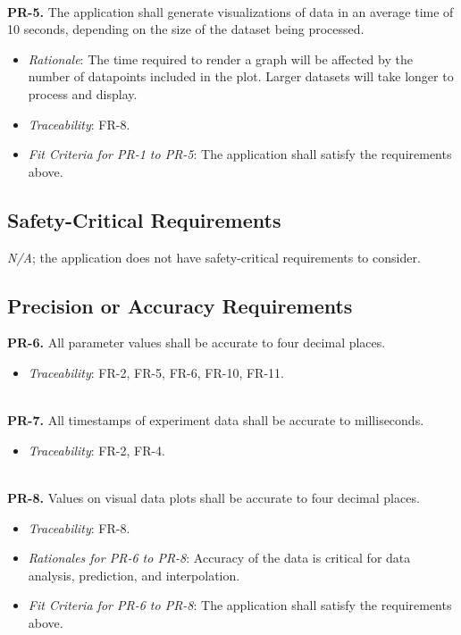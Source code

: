 \documentclass[12pt]{article}
\begin{document}
\ \\
\textbf{PR-5.} The application shall generate visualizations of data in an average time of 10 seconds, depending on the size of the dataset being processed.
  \begin{itemize}
    \item \textit{Rationale}: The time required to render a graph will be affected by the number of datapoints included in the plot. Larger datasets will take longer to process and display.
    \item \textit{Traceability}: FR-8.
  \end{itemize}

\begin{itemize}
  \item \textit{Fit Criteria for PR-1 to PR-5}: The application shall satisfy the requirements above.
\end{itemize}

\subsection{Safety-Critical Requirements}
\emph{N/A}; the application does not have safety-critical requirements to consider.

\subsection{Precision or Accuracy Requirements}
\textbf{PR-6.} All parameter values shall be accurate to four decimal places.
    \begin{itemize}
      \item \textit{Traceability}: FR-2, FR-5, FR-6, FR-10, FR-11.
    \end{itemize}
\ \\
\textbf{PR-7.} All timestamps of experiment data shall be accurate to milliseconds.
    \begin{itemize}
      \item \textit{Traceability}: FR-2, FR-4.
    \end{itemize}
\ \\
\textbf{PR-8.} Values on visual data plots shall be accurate to four decimal places.
    \begin{itemize}
        \item \textit{Traceability}: FR-8.
    \end{itemize}

\begin{itemize}
  \item \textit{Rationales for PR-6 to PR-8}: Accuracy of the data is critical for data analysis, prediction, and interpolation.
  \item \textit{Fit Criteria for PR-6 to PR-8}: The application shall satisfy the requirements above.
\end{itemize}
\end{document}
